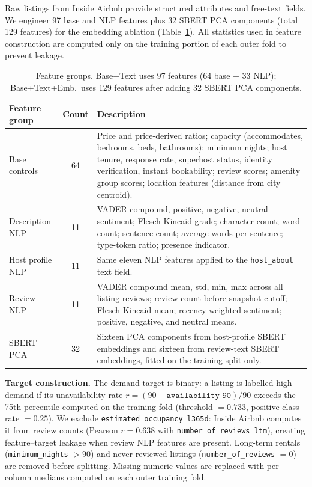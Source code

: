 \documentclass[10pt,a4paper]{article}
\newcommand{\reporttabcolsep}{4pt}
\begin{document}
Raw listings from Inside Airbnb provide structured attributes and free-text
fields. We engineer 97 base and NLP features plus 32 SBERT PCA components (total 129 features)
\cite{reimers2019sbert} for the embedding ablation (Table~\ref{tab:features}).
All statistics used in feature construction are computed only on the training
portion of each outer fold to prevent leakage.

\begin{table}[H]
\centering\small
\setlength{\tabcolsep}{\reporttabcolsep}
\begin{tabular}{p{2.9cm}cp{9.8cm}}
\toprule
Feature group & Count & Description \\
\midrule
Base controls   & 64 &
  Price and price-derived ratios; capacity (accommodates, bedrooms, beds,
  bathrooms); minimum nights; host tenure, response rate, superhost status,
  identity verification, instant bookability; review scores; amenity group
  scores; location features (distance from city centroid). \\[2pt]
Description NLP & 11 &
  VADER compound, positive, negative, neutral sentiment; Flesch-Kincaid grade;
  character count; word count; sentence count; average words per sentence;
  type-token ratio; presence indicator. \\[2pt]
Host profile NLP & 11 &
  Same eleven NLP features applied to the \texttt{host\_about} text field. \\[2pt]
Review NLP      & 11 &
  VADER compound mean, std, min, max across all listing reviews; review count
  before snapshot cutoff; Flesch-Kincaid mean; recency-weighted sentiment;
  positive, negative, and neutral means. \\
SBERT PCA       & 32 &
  Sixteen PCA components from host-profile SBERT embeddings and sixteen from
  review-text SBERT embeddings, fitted on the training split only. \\
\bottomrule
\end{tabular}
\caption{Feature groups. Base+Text uses 97 features (64 base + 33 NLP);
  Base+Text+Emb.\ uses 129 features after adding 32 SBERT PCA components.}
\label{tab:features}
\end{table}

\textbf{Target construction.}
The demand target is binary: a listing is labelled high-demand if its
unavailability rate $r = (90 - \texttt{availability\_90})/90$ exceeds the
75th percentile computed on the training fold (threshold $= 0.733$, positive-class
rate $= 0.25$). We exclude \texttt{estimated\_occupancy\_l365d}: Inside Airbnb
computes it from review counts (Pearson $r = 0.638$ with
\texttt{number\_of\_reviews\_ltm}), creating feature--target leakage when review
NLP features are present. Long-term rentals (\texttt{minimum\_nights} $> 90$)
and never-reviewed listings (\texttt{number\_of\_reviews} $= 0$) are removed
before splitting. Missing numeric values are replaced with per-column medians
computed on each outer training fold.
\end{document}
